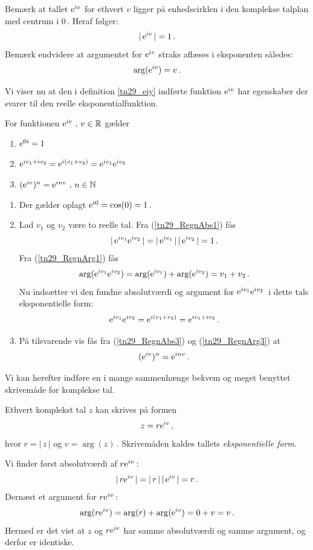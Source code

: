 \begin{aha}
Bemærk at tallet $\mathrm{e}^{iv}$ for ethvert $v$ ligger på enhedscirklen i den komplekse talplan med centrum i $0\,$. Heraf følger:
\begin{equation}
|\,\mathrm{e}^{iv}\,|=1\,.
\end{equation}
Bemærk endvidere at argumentet for $\mathrm{e}^{iv}$ straks aflæses i eksponenten således:
\begin{equation}
\arg(\mathrm{e}^{iv})=v\,.
\end{equation}
\end{aha}
Vi viser nu at den i definition \ref{tn29_eiy} indførte funktion $\mathrm{e}^{iv}$ har egenskaber der svarer til den reelle eksponentialfunktion.\bs 
\begin{theorem}\label{tn29_Th_eiy}
For funktionen $\mathrm{e}^{iv}\,\,,\,v\in \mathbb{R}$ gælder
\begin{enumerate}
\item
$\mathrm{e}^{0i}=1$
\item
$\mathrm{e}^{iv_1+iv_2}=\mathrm{e}^{i(v_1+v_2)}=\mathrm{e}^{iv_1}\mathrm{e}^{iv_2}$
\item
$(\mathrm{e}^{iv})^n=\mathrm{e}^{inv}\,\,,\,n\in\mathbb N$
\end{enumerate}
\end{theorem}
\begin{bevis}
\begin{enumerate}
\item
Der gælder oplagt $\mathrm{e}^{i0}=\cos(0)=1\,.$
\item
Lad $v_1$ og $v_2$ være to reelle tal. Fra (\ref{tn29_RegnAbs1}) fås $$|\,\mathrm{e}^{iv_1}\mathrm{e}^{iv_2}\,|=|\,\mathrm{e}^{iv_1}\,|\,|\,\mathrm{e}^{iv_2}\,|=1\,.$$
Fra (\ref{tn29_RegnArg1}) fås $$\arg(\mathrm{e}^{iv_1}\mathrm{e}^{iv_2})=\arg(\mathrm{e}^{iv_1})+\arg(\mathrm{e}^{iv_2})=v_1+v_2\,.$$
Nu indsætter vi den fundne absolutværdi og argument for $\mathrm{e}^{iv_1}\mathrm{e}^{iv_2}\,$ i dette tals eksponentielle form: 
$$\mathrm{e}^{iv_1}\mathrm{e}^{iv_2}=\mathrm{e}^{i(v_1+v_2)}=\mathrm{e}^{iv_1+iv_2}\,.$$
\item
På tilsvarende vis fås fra (\ref{tn29_RegnAbs3}) og (\ref{tn29_RegnArg3}) at 
\begin{equation}
(\mathrm{e}^{iv})^n=\mathrm{e}^{inv}\,.
\end{equation}
\end{enumerate}
\end{bevis}

Vi kan herefter indføre en i mange sammenhænge bekvem og meget benyttet skrivemåde for komplekse tal.

\begin{theorem}
Ethvert komplekst tal $z$ kan skrives på formen
\begin{equation}\label{tn29_ekspForm1}
z=r\mathrm{e}^{iv}\,,
\end{equation}
hvor $r=|\,z\,|$ og $v=\arg(z)\,$. Skrivemåden kaldes tallets \textit{eksponentielle form}.
\end{theorem}
\begin{bevis}
Vi finder først absolutværdi af $r\mathrm{e}^{iv}\,$:
$$|\,r\mathrm{e}^{iv}\,|=|\,r\,|\,|\,\mathrm{e}^{iv}\,|=r\,.$$
Dernæst et argument for $r\mathrm{e}^{iv}\,$:
$$\arg(r\mathrm{e}^{iv})=\arg(r)+\arg(\mathrm{e}^{iv})=0+v=v\,.$$ 
Hermed er det vist at $z$ og $r\mathrm{e}^{iv}$ har samme absolutværdi og samme argument, og derfor er identiske.
\end{bevis}


